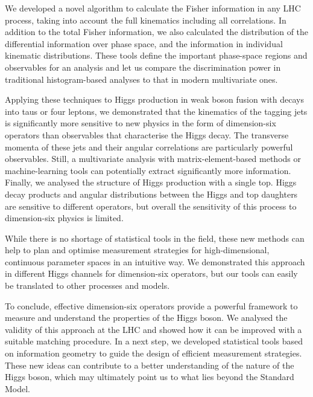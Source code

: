We developed a novel algorithm to calculate the Fisher information in
any LHC process, taking into account the full kinematics including all
correlations. In addition to the total Fisher information, we also
calculated the distribution of the differential information over phase
space, and the information in individual kinematic
distributions. These tools define the important phase-space regions
and observables for an analysis and let us compare the discrimination
power in traditional histogram-based analyses to that in modern
multivariate ones.

Applying these techniques to Higgs production in weak boson fusion
with decays into taus or four leptons, we demonstrated that the
kinematics of the tagging jets is significantly more sensitive to new
physics in the form of dimension-six operators than observables that
characterise the Higgs decay.  The transverse momenta of these jets
and their angular correlations are particularly powerful
observables. Still, a multivariate analysis with matrix-element-based
methods or machine-learning tools can potentially extract
significantly more information. Finally, we analysed the structure of
Higgs production with a single top. Higgs decay products and angular
distributions between the Higgs and top daughters are sensitive to
different operators, but overall the sensitivity of this process to
dimension-six physics is limited.

%
While there is no shortage of statistical tools in the field, these
new methods can help to plan and optimise measurement strategies for
high-dimensional, continuous parameter spaces in an intuitive way. We
demonstrated this approach in different Higgs channels for
dimension-six operators, but our tools can easily be translated to
other processes and models.

\newparagraph
%
To conclude, effective dimension-six operators provide a powerful
framework to measure and understand the properties of the Higgs
boson. We analysed the validity of this approach at the LHC and showed
how it can be improved with a suitable matching procedure. In a next
step, we developed statistical tools based on information geometry to
guide the design of efficient measurement strategies. These new ideas
can contribute to a better understanding of the nature of the Higgs
boson, which may ultimately point us to what lies beyond the Standard
Model.
